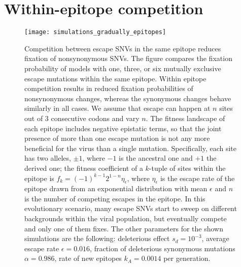 \newpage
\section{Within-epitope competition}
\begin{figure}[h]
\begin{center}
\texttt{[image: simulations\_gradually\_epitopes]}
\caption{
Competition between escape SNVs in the same epitope reduces fixation of
nonsynonymous SNVs. The figure compares the fixation probability of models
with one, three, or six mutually exclusive escape mutations within the
same epitope. Within epitope competition results in reduced fixation
probabilities of nonsynonymous changes, whereas the synonymous changes behave 
similarly in all cases. We assume that escape can happen at $n$ sites out of 3
consecutive codons and vary $n$.
The fitness landscape of each epitope includes negative epistatic terms, so that
the joint presence of more than one escape mutation is not any more beneficial
for the virus than a single mutation. Specifically, each site has two alleles,
$\pm 1$, where $-1$ is the ancestral one and $+1$ the derived one; the fitness
coefficient of a $k$-tuple of sites within the epitope is $f_k = (-1)^{k-1}
2^{1-n}\eta_\epsilon $, where $\eta_\epsilon$ is the escape rate of the epitope
drawn from an exponential distribution with mean $\epsilon$ and 
$n$ is the number of competing escapes in the epitope. 
In this evolutionary scenario, many escape SNVs start to sweep on different backgrounds within the viral population, but eventually
compete and only one of them fixes. The other parameters for the shown simulations are
the following: deleterious effect $s_d = 10^{-3}$, average escape rate $\epsilon = 0.016$,
fraction of deleterious synonymous mutations $\alpha = 0.986$, rate of new epitopes
$k_A=0.0014$ per generation.
}
\label{fig:wec}
\end{center}
\end{figure}

